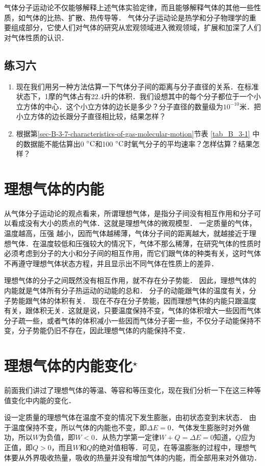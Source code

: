 气体分子运动论不仅能够解释上述气体实验定律，而且能够解释气体的其他一些性质，如气体的比热、扩散、热传导等．
气体分子运动论是热学和分子物理学的重要组成部分，它使人们对气体的研究从宏观领域进入微观领域，扩展和加深了人们对气体性质的认识．


\subsection*{练习六}

\begin{enumerate}
    \item 现在我们用另一种方法估算一下气体分子间的距离与分子直径的关系．在标准状态下，1摩的气体占有22.4升的体积．我们设想其中的每个分子都位于一个小立方体的中心．这个小立方体的边长是多少？分子直径的数量级为$10^{-10}$米．把小立方体的边长跟分子直径相比较，结果怎样？
\item 根据第\ref{sec-B-3-7-characteristics-of-gas-molecular-motion}节表 \ref{tab_B_3-1} 中的数据能不能估算出0$\;{}^\circ\text{C}$和100$\;{}^\circ\text{C}$时氧气分子的平均速率？怎样估算？结果怎样？
\end{enumerate}

\section{理想气体的内能}
从气体分子运动论的观点看来，所谓理想气体，是指分子间没有相互作用和分子可以看成没有大小的质点的气体．这就是理想气体的微观模型．
一定质量的气体，温度越高，压强
越小，因而气体越稀薄，气体分子间的距离越大，就越接近于理想气体．在温度较低和压强较大的情况下，气体不那么稀薄，在研究气体的性质时必须考虑到分子的大小和分子间的相互作用，而它们跟气体的种类有关，这时气体不再遵守理想气体状态方程，并且显示出不同气体在性质上的差异．

理想气体的分子之间既然没有相互作用，就不存在分子势能．
因此，理想气体的内能就是气体所有分子热运动的动能的总和．
分子的动能跟气体的温度有关，分子势能跟气体的体积有关．
现在不存在分子势能，因而理想气体的内能只跟温度有关，跟体积无关．这就是说，只要温度保持不变，气体的体积增大一些因而气体分子疏一些，或者气体的体积减小一些因而气体分子密一些，不仅分子动能保持不变，分子势能仍旧不存在，因此理想气体的内能保持不变．

\section{理想气体的内能变化$^\star$}
前面我们讲过了理想气体的等温、等容和等压变化，现在我们分析一下在这三种等值变化中内能的变化．

设一定质量的理想气体在温度不变的情况下发生膨胀，由初状态变到末状态．
由于温度保持不变，所以气体的内能也不变，即$\Delta E=0$．气体发生膨胀时对外做功，所以$W$为负值，即$W<0$．从热力学第一定律$W+Q=\Delta E=0$知道，$Q$应为正值，即$Q>0$，而且$W$和$Q$的绝对值相等．可见，在等温膨胀的过程中，理想气体要从外界吸收热量，吸收的热量并没有增加气体的内能，而全部用来对外做功．


